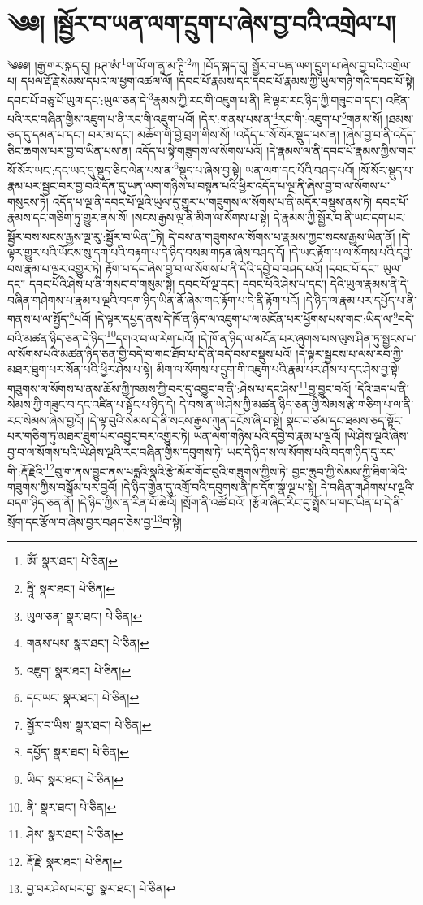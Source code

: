 \setcounter{footnote}{0} 
\chapter{༄༅། །སྦྱོར་བ་ཡན་ལག་དྲུག་པ་ཞེས་བྱ་བའི་འགྲེལ་པ།}༄༅༅། །རྒྱ་གར་སྐད་དུ། ཥཊ་ཨཾ་\footnote{ཨོཾ་  སྣར་ཐང་།  པེ་ཅིན། }ག་ཡོ་ག་ནཱ་མ་ཊཱི་\footnote{རྦཱི་  སྣར་ཐང་།  པེ་ཅིན། }ཀ །བོད་སྐད་དུ། སྦྱོར་བ་ཡན་ལག་དྲུག་པ་ཞེས་བྱ་བའི་འགྲེལ་པ། དཔལ་རྡོ་རྗེ་སེམས་དཔའ་ལ་ཕྱག་འཚལ་ལོ། །དབང་པོ་རྣམས་དང་དབང་པོ་རྣམས་ཀྱི་ཡུལ་གཉི་གའི་དབང་པོ་སྟེ། དབང་པོ་བཅུ་པོ་ཡུལ་དང་:ཡུལ་ཅན་དེ་\footnote{ཡུལ་ཅན་  སྣར་ཐང་།  པེ་ཅིན། }རྣམས་ཀྱི་རང་གི་འཇུག་པ་ནི། ཇི་ལྟར་རང་ཉིད་ཀྱི་གཟུང་བ་དང་། འཛིན་པའི་རང་བཞིན་གྱིས་འཇུག་པ་ནི་རང་གི་འཇུག་པའོ། །དེར་:གནས་པས་ན་\footnote{གནས་པས་  སྣར་ཐང་།  པེ་ཅིན། }རང་གི་:འཇུག་པ་\footnote{འཇུག་  སྣར་ཐང་།  པེ་ཅིན། }གནས་སོ། །ཐམས་ཅད་དུ་དམན་པ་དང་། བར་མ་དང་། མཆོག་གི་བྱེ་བྲག་གིས་སོ། །འདོད་པ་སོ་སོར་སྡུད་པས་ན། །ཞེས་བྱ་བ་ནི་འདོད་ཅིང་ཆགས་པར་བྱ་བ་ཡིན་པས་ན། འདོད་པ་སྟེ་གཟུགས་ལ་སོགས་པའོ། །དེ་རྣམས་ལ་ནི་དབང་པོ་རྣམས་ཀྱིས་གང་སོ་སོར་ཡང་:དང་ཡང་དུ་སྡུད་ཅིང་ལེན་པས་ན་\footnote{དང་ཡང་  སྣར་ཐང་།  པེ་ཅིན། }སྡུད་པ་ཞེས་བྱ་སྟེ། ཡན་ལག་དང་པོའི་བཤད་པའོ། །སོ་སོར་སྡུད་པ་རྣམ་པར་སྦྱང་བར་བྱ་བའི་དོན་དུ་ཡན་ལག་གཉིས་པ་བསྟན་པའི་ཕྱིར་འདོད་པ་ལྔ་ནི་ཞེས་བྱ་བ་ལ་སོགས་པ་གསུངས་ཏེ། འདོད་པ་ལྔ་ནི་དབང་པོ་ལྔའི་ཡུལ་དུ་གྱུར་པ་གཟུགས་ལ་སོགས་པ་ནི་མདོར་བསྡུས་ནས་ཏེ། དབང་པོ་རྣམས་དང་གཅིག་ཏུ་གྱུར་ནས་སོ། །སངས་རྒྱས་ལྔ་ནི་མིག་ལ་སོགས་པ་སྟེ། དེ་རྣམས་ཀྱི་སྦྱོར་བ་ནི་ཡང་དག་པར་སྦྱོར་བས་སངས་རྒྱས་ལྔ་རུ་:སྦྱོར་བ་ཡིན་\footnote{སྦྱོར་བ་ཡིས་  སྣར་ཐང་།  པེ་ཅིན། }ཏེ། དེ་བས་ན་གཟུགས་ལ་སོགས་པ་རྣམས་ཀྱང་སངས་རྒྱས་ཡིན་ནོ། །དེ་ལྟར་གྱུར་པའི་ཡོངས་སུ་དག་པའི་བརྟག་པ་དེ་ཉིད་བསམ་གཏན་ཞེས་བཤད་དོ། །དེ་ཡང་རྟོག་པ་ལ་སོགས་པའི་དབྱེ་བས་རྣམ་པ་ལྔར་འགྱུར་ཏེ། རྟོག་པ་དང་ཞེས་བྱ་བ་ལ་སོགས་པ་ནི་དེའི་དབྱེ་བ་བཤད་པའོ། །དབང་པོ་དང་། ཡུལ་དང་། དབང་པོའི་ཤེས་པ་ནི་གསང་བ་གསུམ་སྟེ། དབང་པོ་ལྔ་དང་། དབང་པོའི་ཤེས་པ་དང་། དེའི་ཡུལ་རྣམས་ནི་དེ་བཞིན་གཤེགས་པ་རྣམ་པ་ལྔའི་བདག་ཉིད་ཡིན་ནོ་ཞེས་གང་རྟོག་པ་དེ་ནི་རྟོག་པའོ། །དེ་ཉིད་ལ་རྣམ་པར་དཔྱོད་པ་ནི་གནས་པ་ལ་སྤྱོད་\footnote{དཔྱོད་  སྣར་ཐང་།  པེ་ཅིན། }པའོ། །དེ་ལྟར་དཔྱད་ནས་དེ་ཁོ་ན་ཉིད་ལ་འཇུག་པ་ལ་མངོན་པར་ཕྱོགས་པས་གང་:ཡིད་ལ་\footnote{ཡིད་  སྣར་ཐང་།  པེ་ཅིན། }བདེ་བའི་མཚན་ཉིད་ཅན་དེ་ཉིད་\footnote{ནི་  སྣར་ཐང་།  པེ་ཅིན། }དགའ་བ་ལ་རེག་པའོ། །དེ་ཁོ་ན་ཉིད་ལ་མངོན་པར་ཞུགས་པས་ལུས་ཤིན་ཏུ་སྦྱངས་པ་ལ་སོགས་པའི་མཚན་ཉིད་ཅན་གྱི་བདེ་བ་གང་ཐོབ་པ་དེ་ནི་བདེ་བས་བསྡུས་པའོ། །དེ་ལྟར་སྦྱངས་པ་ལས་རབ་ཀྱི་མཐར་ཐུག་པར་སོན་པའི་ཕྱིར་ཤེས་པ་སྟེ། མིག་ལ་སོགས་པ་དྲུག་གི་འཇུག་པའི་རྣམ་པར་ཤེས་པ་དང་ཤེས་བྱ་སྟེ། གཟུགས་ལ་སོགས་པ་ནས་ཆོས་ཀྱི་ཁམས་ཀྱི་བར་དུ་འབྱུང་བ་ནི་:ཤེས་པ་དང་ཤེས་\footnote{ཤེས་  སྣར་ཐང་།  པེ་ཅིན། }བྱ་བྱུང་བའོ། །དེའི་ཟད་པ་ནི་སེམས་ཀྱི་གཟུང་བ་དང་འཛིན་པ་སྟོང་པ་ཉིད་དེ། དེ་བས་ན་ཡེ་ཤེས་ཀྱི་མཚན་ཉིད་ཅན་གྱི་སེམས་རྩེ་གཅིག་པ་ལ་ནི་རང་སེམས་ཞེས་བྱའོ། །དེ་ལྟ་བུའི་སེམས་དེ་ནི་སངས་རྒྱས་ཀུན་དངོས་ཞི་བ་སྟེ། སྣང་བ་ཙམ་དང་ཐམས་ཅད་སྟོང་པར་གཅིག་ཏུ་མཐར་ཐུག་པར་འབྱུང་བར་འགྱུར་ཏེ། ཡན་ལག་གཉིས་པའི་དབྱེ་བ་རྣམ་པ་ལྔའོ། །ཡེ་ཤེས་ལྔའི་ཞེས་བྱ་བ་ལ་སོགས་པའི་ཡེ་ཤེས་ལྔའི་རང་བཞིན་གྱིས་དབུགས་ཏེ། ཡང་དེ་ཉིད་ས་ལ་སོགས་པའི་བདག་ཉིད་དུ་རང་གི་:རྡོ་རྗེའི་\footnote{རྡོ་རྗེ་  སྣར་ཐང་།  པེ་ཅིན། }བུ་ག་ནས་བྱུང་ནས་པདྨའི་སྣའི་རྩེ་མོར་གོང་བུའི་གཟུགས་ཀྱིས་ཏེ། བྱང་ཆུབ་ཀྱི་སེམས་ཀྱི་ཐིག་ལེའི་གཟུགས་ཀྱིས་བསྒོམ་པར་བྱའོ། །དེ་ཉིད་གྱེན་དུ་འགྲོ་བའི་དབུགས་ནི་ཁ་དོག་སྣ་ལྔ་པ་སྟེ། དེ་བཞིན་གཤེགས་པ་ལྔའི་བདག་ཉིད་ཅན་ནོ། །དེ་ཉིད་ཀྱིས་ན་རིན་པོ་ཆེའོ། །སྲོག་ནི་འཚོ་བའོ། །རྩོལ་ཞིང་རིང་དུ་སྤྲོས་པ་གང་ཡིན་པ་དེ་ནི་སྲོག་དང་རྩོལ་བ་ཞེས་བྱར་བཤད་ཅེས་བྱ་\footnote{བྱ་བར་ཤེས་པར་བྱ་  སྣར་ཐང་།  པེ་ཅིན། }བ་སྟེ། 